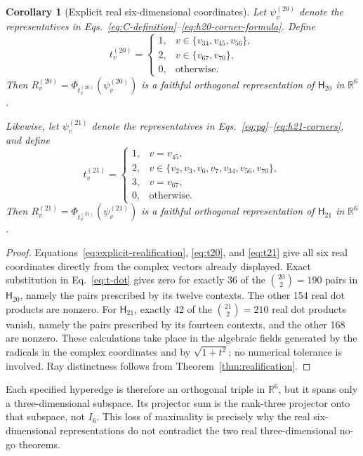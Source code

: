\documentclass[twocolumn,aps,pra,floatfix,amsmath,amssymb,longbibliography]{revtex4-2}
\newtheorem{corollary}[theorem]{Corollary}
\theoremstyle{definition}
\theoremstyle{remark}
\newcommand{\R}{\mathbb R}
\newcommand{\Htwenty}{\mathsf H_{20}}
\newcommand{\Htwentyone}{\mathsf H_{21}}
\begin{document}
\begin{corollary}[Explicit real six-dimensional coordinates]
\label{cor:r6}
Let $\psi_v^{(20)}$ denote the representatives in
Eqs.~\eqref{eq:C-definition}--\eqref{eq:h20-corner-formula}.  Define
\begin{equation}
 t_v^{(20)}=
 \begin{cases}
  1,&v\in\{v_{34},v_{45},v_{56}\},\\
  2,&v\in\{v_{67},v_{70}\},\\
  0,&\text{otherwise}.
 \end{cases}
 \label{eq:t20}
\end{equation}
Then $R_v^{(20)}=\Phi_{t_v^{(20)}}(\psi_v^{(20)})$ is a faithful orthogonal
representation of $\Htwenty$ in $\R^6$.

Likewise, let $\psi_v^{(21)}$ denote the representatives in
Eqs.~\eqref{eq:pq}--\eqref{eq:h21-corners}, and define
\begin{equation}
 t_v^{(21)}=
 \begin{cases}
  1,&v=v_{45},\\
  2,&v\in\{v_2,v_3,v_6,v_7,v_{34},v_{56},v_{70}\},\\
  3,&v=v_{67},\\
  0,&\text{otherwise}.
 \end{cases}
 \label{eq:t21}
\end{equation}
Then $R_v^{(21)}=\Phi_{t_v^{(21)}}(\psi_v^{(21)})$ is a faithful orthogonal
representation of $\Htwentyone$ in $\R^6$.
\end{corollary}

\begin{proof}
Equations~\eqref{eq:explicit-realification}, \eqref{eq:t20}, and
\eqref{eq:t21} give all six real coordinates directly from the complex
vectors already displayed.  Exact substitution in Eq.~\eqref{eq:t-dot}
gives zero for exactly 36 of the $\binom{20}{2}=190$ pairs in $\Htwenty$,
namely the pairs prescribed by its twelve contexts.  The other 154 real dot
products are nonzero.  For $\Htwentyone$, exactly 42 of the
$\binom{21}{2}=210$ real dot products vanish, namely the pairs prescribed by
its fourteen contexts, and the other 168 are nonzero.  These calculations
take place in the algebraic fields generated by the radicals in the complex
coordinates and by $\sqrt{1+t^2}$; no numerical tolerance is involved.
Ray distinctness follows from Theorem~\ref{thm:realification}.
\end{proof}

Each specified hyperedge is therefore an orthogonal triple in
$\R^6$, but it spans only a three-dimensional subspace.  Its projector sum
is the rank-three projector onto that subspace, not $I_6$.  This loss of
maximality is precisely why the real six-dimensional representations do not
contradict the two real three-dimensional no-go theorems.
\end{document}
